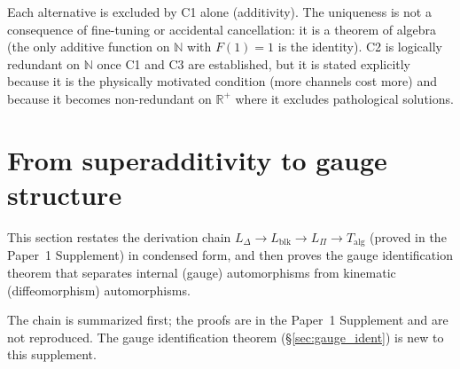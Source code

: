 \documentclass[11pt]{article}
\theoremstyle{definition}
\begin{document}
\smallskip\noindent Each alternative is excluded by C1 alone (additivity).
The uniqueness is not a consequence of fine-tuning or accidental
cancellation: it is a theorem of algebra (the only additive function on
$\mathbb{N}$ with $F(1) = 1$ is the identity).  C2 is logically
redundant on $\mathbb{N}$ once C1 and C3 are established, but it is
stated explicitly because it is the physically motivated condition
(more channels cost more) and because it becomes non-redundant on
$\mathbb{R}^+$ where it excludes pathological solutions.


\newpage


\section{From superadditivity to gauge structure}
\label{sec:nc_chain}

This section restates the derivation chain $L_\Delta \to L_{\mathrm{blk}}
\to L_\Pi \to T_{\mathrm{alg}}$ (proved in the Paper~1 Supplement) in
condensed form, and then proves the gauge identification theorem that
separates internal (gauge) automorphisms from kinematic (diffeomorphism)
automorphisms.

The chain is summarized first; the proofs are in the Paper~1 Supplement
and are not reproduced.  The gauge identification theorem
(\S\ref{sec:gauge_ident}) is new to this supplement.
\end{document}
